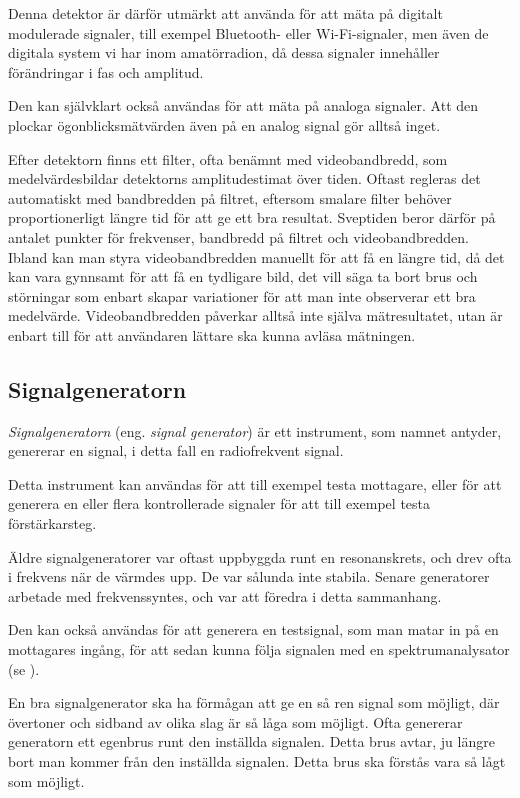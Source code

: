 Denna detektor är därför utmärkt att använda för att mäta på digitalt modulerade
signaler, till exempel Bluetooth- eller Wi-Fi-signaler, men även de digitala
system vi har inom amatörradion, då dessa signaler innehåller förändringar i fas
och amplitud.

Den kan självklart också användas för att mäta på analoga signaler.
Att den plockar ögonblicksmätvärden även på en analog signal gör alltså inget.

Efter detektorn finns ett filter, ofta benämnt med videobandbredd, som
medelvärdesbildar detektorns amplitudestimat över tiden.
Oftast regleras det automatiskt med bandbredden på filtret, eftersom smalare
filter behöver proportionerligt längre tid för att ge ett bra resultat.
Sveptiden beror därför på antalet punkter för frekvenser, bandbredd på filtret
och videobandbredden.
Ibland kan man styra videobandbredden manuellt för att få en längre tid, då
det kan vara gynnsamt för att få en tydligare bild, det vill säga ta bort brus
och störningar som enbart skapar variationer för att man inte observerar ett bra
medelvärde.
Videobandbredden påverkar alltså inte själva mätresultatet, utan är enbart till
för att användaren lättare ska kunna avläsa mätningen.

\subsection{Signalgeneratorn}

\emph{Signalgeneratorn} (eng. \emph{signal generator}) är ett instrument, som
namnet antyder, genererar en signal, i detta fall en radiofrekvent signal.

Detta instrument kan användas för att till exempel testa mottagare, eller för
att generera en eller flera kontrollerade signaler för att till exempel testa
förstärkarsteg.

Äldre signalgeneratorer var oftast uppbyggda runt en resonanskrets, och drev
ofta i frekvens när de värmdes upp.
De var sålunda inte stabila.
Senare generatorer arbetade med frekvenssyntes, och var att föredra i detta
sammanhang.

Den kan också användas för att generera en testsignal, som man matar in på en
mottagares ingång, för att sedan kunna följa signalen med en spektrumanalysator
(se ).

En bra signalgenerator ska ha förmågan att ge en så ren signal som möjligt,
där övertoner och sidband av olika slag är så låga som möjligt.
Ofta genererar generatorn ett egenbrus runt den inställda signalen.
Detta brus avtar, ju längre bort man kommer från den inställda signalen.
Detta brus ska förstås vara så lågt som möjligt.

